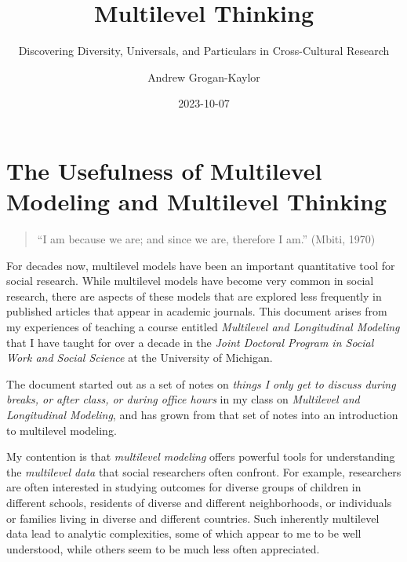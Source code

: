 \documentclass[
  letterpaper,
  DIV=11,
  numbers=noendperiod]{scrreprt}
\title{Multilevel Thinking}
\subtitle{Discovering Diversity, Universals, and Particulars in
Cross-Cultural Research}
\author{Andrew Grogan-Kaylor}
\date{2023-10-07}
\renewcommand*\contentsname{Table of contents}
\newcommand\contentsname{Table of contents}
\begin{document}
\maketitle
\ifdefined\Shaded\renewenvironment{Shaded}{\begin{tcolorbox}[borderline west={3pt}{0pt}{shadecolor}, breakable, frame hidden, interior hidden, boxrule=0pt, enhanced, sharp corners]}{\end{tcolorbox}}\fi

\renewcommand*\contentsname{Table of contents}
{
\hypersetup{linkcolor=}
\setcounter{tocdepth}{2}
\tableofcontents
}
\listoffigures
\listoftables
{}

\hypertarget{the-usefulness-of-multilevel-modeling-and-multilevel-thinking}{%
\chapter{The Usefulness of Multilevel Modeling and Multilevel
Thinking}\label{the-usefulness-of-multilevel-modeling-and-multilevel-thinking}}

\begin{quote}
``I am because we are; and since we are, therefore I am.'' (Mbiti, 1970)
\end{quote}

For decades now, multilevel models have been an important quantitative
tool for social research. While multilevel models have become very
common in social research, there are aspects of these models that are
explored less frequently in published articles that appear in academic
journals. This document arises from my experiences of teaching a course
entitled \emph{Multilevel and Longitudinal Modeling} that I have taught
for over a decade in the \emph{Joint Doctoral Program in Social Work and
Social Science} at the University of Michigan.

The document started out as a set of notes on \emph{things I only get to
discuss during breaks, or after class, or during office hours} in my
class on \emph{Multilevel and Longitudinal Modeling}, and has grown from
that set of notes into an introduction to multilevel modeling.

My contention is that \emph{multilevel modeling} offers powerful tools
for understanding the \emph{multilevel data} that social researchers
often confront. For example, researchers are often interested in
studying outcomes for diverse groups of children in different schools,
residents of diverse and different neighborhoods, or individuals or
families living in diverse and different countries. Such inherently
multilevel data lead to analytic complexities, some of which appear to
me to be well understood, while others seem to be much less often
appreciated.
\end{document}
